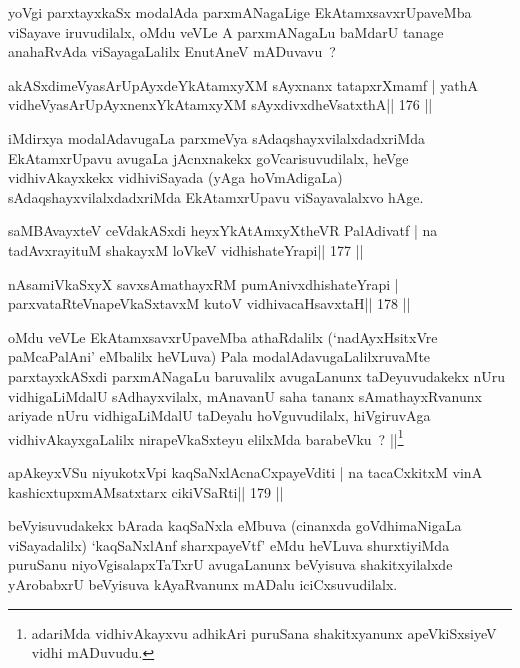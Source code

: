 \begin{artha}
yoVgi parxtayxkaSx modalAda parxmANagaLige EkAtamxsavxrUpaveMba viSayave iruvudilalx, oMdu veVLe A parxmANagaLu baMdarU tanage anahaRvAda viSayagaLalilx EnutAneV mADuvavu~?
\end{artha}

\begin{shl}
akASxdimeVyasArUpAyxdeYkAtamxyXM sAyxnanx tatapxrXmamf |
yathA vidheVyasArUpAyxnenxYkAtamxyXM sAyxdivxdheVsatxthA\hfill || 176 ||
\end{shl}

\begin{artha}
iMdirxya modalAdavugaLa parxmeVya sAdaqshayxvilalxdadxriMda EkAtamxrUpavu avugaLa jAcnxnakekx goVcarisuvudilalx, heVge vidhivAkayxkekx vidhiviSayada (yAga hoVmAdigaLa) sAdaqshayxvilalxdadxriMda EkAtamxrUpavu viSayavalalxvo hAge.
\end{artha}

\begin{shl}
saMBAvayxteV ceVdakASxdi heyxYkAtAmxyXtheVR PalAdivatf |
na tadAvxrayituM shakayxM loVkeV vidhishateYrapi\hfill || 177 ||
\end{shl}

\begin{shl}
nAsamiVkaSxyX savxsAmathayxRM pumAnivxdhishateYrapi |
parxvataRteV\s napeVkaSxtavxM kutoV vidhivacaHsavxtaH\hfill || 178 ||
\end{shl}

\begin{artha}
oMdu veVLe EkAtamxsavxrUpaveMba athaRdalilx (`nadAyxHsitxVre paMcaPalAni'  eMbalilx heVLuva) Pala modalAdavugaLalilxruvaMte parxtayxkASxdi parxmANagaLu baruvalilx avugaLanunx taDeyuvudakekx nUru vidhigaLiMdalU sAdhayxvilalx, mAnavanU saha tananx sAmathayxRvanunx ariyade nUru vidhigaLiMdalU taDeyalu hoVguvudilalx, hiVgiruvAga vidhivAkayxgaLalilx nirapeVkaSxteyu elilxMda barabeVku~? ||\footnote{adariMda vidhivAkayxvu adhikAri puruSana shakitxyanunx apeVkiSxsiyeV vidhi mADuvudu.}
\end{artha}


\begin{shl}
apAkeyxVSu niyukotxV\s pi kaqSaNxlAcnaCxpayeVditi |
na tacaCxkitxM vinA kashicxtupxmAMsatxtarx cikiVSaRti\hfill || 179 ||
\end{shl}

\begin{artha}
beVyisuvudakekx bArada kaqSaNxla eMbuva (cinanxda goVdhimaNigaLa viSayadalilx) `\footnotemark[1]kaqSaNxlAnf sharxpayeVtf' eMdu heVLuva shurxtiyiMda puruSanu niyoVgisalapxTaTxrU avugaLanunx beVyisuva shakitxyilalxde yArobabxrU beVyisuva kAyaRvanunx mADalu iciCxsuvudilalx.
\end{artha}

